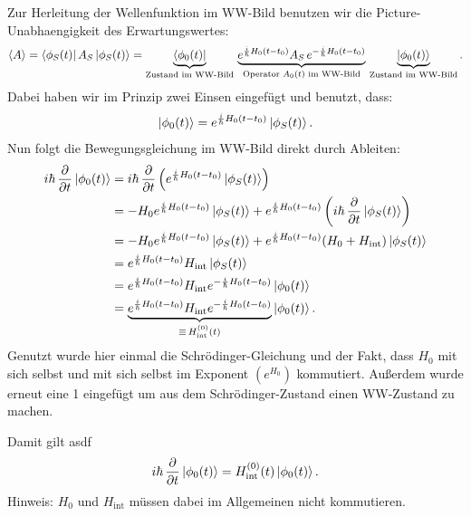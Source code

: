 Zur Herleitung der Wellenfunktion im WW-Bild
benutzen wir die Picture-Unabhaengigkeit des
Erwartungswertes:
\begin{equation}
  \left\langle A\right\rangle
  =\left\langle\phi_S(t)\right|A_S\left|\phi_S(t)\right\rangle
  =\underbrace{\left\langle\phi_0(t)\right|}_{\text{Zustand im WW-Bild}}
  \,\underbrace{e^{\frac{i}{\hbar}
        H_0(t-t_0)}A_S\,e^{-\frac{i}{\hbar}H_0(t-t_0)}}_{\text{Operator }A_0(t)\text{ im WW-Bild}} \,\underbrace{\left|\phi_0(t)\right\rangle}_{\text{Zustand im WW-Bild}}.
\end{equation}
Dabei haben wir im Prinzip zwei Einsen eingefügt und benutzt, dass:
\begin{equation}
  \left|\phi_0(t)\right\rangle=e^{\frac{i}{\hbar}
      H_0(t-t_0)}\left|\phi_S(t)\right\rangle.
\end{equation}
Nun folgt die Bewegungsgleichung im WW-Bild direkt durch Ableiten:
\begin{equation}
  \begin{aligned}
    i\hbar\,\frac{\partial}{\partial t}\left|\phi_0(t)\right\rangle
     & = i\hbar\,\frac{\partial}{\partial t}\left(e^{\frac{i}{\hbar} H_0(t-t_0)}\left|\phi_S(t)\right\rangle\right)                                                  \\
     & = -H_0e^{\frac{i}{\hbar}H_0(t-t_0)}\left|\phi_S(t)\right\rangle +e^{\frac{i}{\hbar}H_0(t-t_0)}\left(i\hbar\,\frac{\partial}{\partial t}\left|\phi_S(t)\right\rangle\right) \\
     & = -H_0e^{\frac{i}{\hbar}H_0(t-t_0)}\left|\phi_S(t)\right\rangle +e^{\frac{i}{\hbar}H_0(t-t_0)}(H_0+H_{\mathrm{int}})\left|\phi_S(t)\right\rangle                           \\
     & = e^{\frac{i}{\hbar}H_0(t-t_0)}H_{\mathrm{int}}\left|\phi_S(t)\right\rangle                                                                                   \\
     & = e^{\frac{i}{\hbar}H_0(t-t_0)}H_{\mathrm{int}}e^{-\frac{i}{\hbar}H_0(t-t_0)}\left|\phi_0(t)\right\rangle                                                     \\
     & = \underbrace{e^{\frac{i}{\hbar}H_0(t-t_0)}H_{\mathrm{int}}e^{-\frac{i}{\hbar}H_0(t-t_0)}}_{\equiv\,H_{\mathrm{int}}^{(0)}(t)}\left|\phi_0(t)\right\rangle.
  \end{aligned}
\end{equation}
Genutzt wurde hier einmal die Schrödinger-Gleichung und der Fakt, dass $H_0$ mit sich selbst und mit sich selbst im Exponent $(e^{H_0})$ kommutiert.
Außerdem wurde erneut eine 1 eingefügt um aus dem Schrödinger-Zustand einen WW-Zustand zu machen.

Damit gilt asdf
\begin{equation}
  i\hbar\,\frac{\partial}{\partial t}\left|\phi_0(t)\right\rangle=H_{\mathrm{int}}^{(0)}(t)\left|\phi_0(t)\right\rangle.
\end{equation}
Hinweis: $H_0$ und $H_{\mathrm{int}}$ müssen dabei im Allgemeinen nicht kommutieren.

